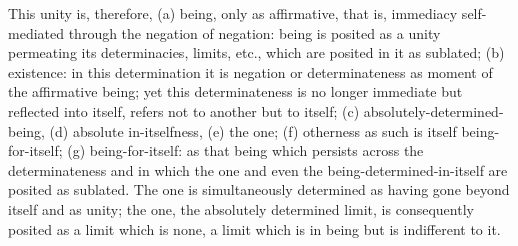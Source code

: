 This unity is, therefore,
(a) being, only as affirmative, that is,
immediacy self-mediated through the negation of negation:
being is posited as a unity permeating
its determinacies, limits, etc.,
which are posited in it as sublated;
(b) existence:
in this determination it is negation
or determinateness as moment of
the affirmative being;
yet this determinateness is no longer
immediate but reflected into itself,
refers not to another but to itself;
(c) absolutely-determined-being,
(d) absolute in-itselfness,
(e) the one;
(f) otherness as such is itself being-for-itself;
(g) being-for-itself:
as that being which persists
across the determinateness
and in which the one
and even the being-determined-in-itself
are posited as sublated.
The one is simultaneously determined
as having gone beyond itself and as unity;
the one, the absolutely determined limit,
is consequently posited as a limit which is none,
a limit which is in being but is indifferent to it.
